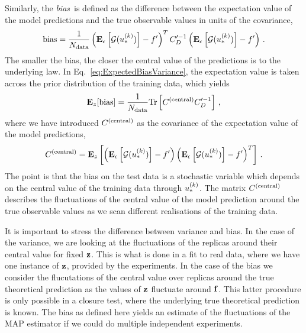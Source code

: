 Similarly, the {\em bias}\ is defined as the difference between the expectation
value of the model predictions and the true observable values in units of the
covariance, \ie 
\begin{equation}
    \label{eq:BiasDef}
    {\rm bias} = \frac{1}{N_{\rm data}}
    \left( \mathbf{E}_{\epsilon}\left[ \mathcal{G}(u_*^{(k)}) \right] - f^\prime \right)^T
        C_D^{\prime -1}
    \left( \mathbf{E}_{\epsilon}\left[ \mathcal{G}(u_*^{(k)}) \right] - f^\prime \right)\, .
\end{equation}
The smaller the bias, the closer the central value of the predictions is to the
underlying law. In Eq.~\ref{eq:ExpectedBiasVariance}, the expectation value is
taken across the prior distribution of the training data, which yields
\begin{equation}
    \mathbf{E}_{z}[{\rm bias}] = \frac{1}{N_{\rm data}}
    {\rm Tr} \left[ C^{(\rm central)} C_D^{\prime -1}{} \right]\, ,
\end{equation}
where we have introduced $C^{(\rm central)}$ as the covariance of the expectation value
of the model predictions,
\begin{equation}
    \label{eq:CovCentDef}
    C^{(\rm central)} = 
    \mathbf{E}_{z}\left[
        \left( \mathbf{E}_{\epsilon}\left[ \mathcal{G}(u_*^{(k)}) \right] - f^\prime \right)
        \left( \mathbf{E}_{\epsilon}\left[ \mathcal{G}(u_*^{(k)}) \right] - f^\prime \right)^T   
    \right]\, .
\end{equation}
The point is that the bias on the test data is a stochastic variable which
depends on the central value of the training data through $u_*^{(k)}$. The
matrix $C^{(\rm central)}$ describes the fluctuations of the central value of the model
prediction around the true observable values as we scan different realisations
of the training data. 

It is important to stress the difference between variance and bias. In the case
of the variance, we are looking at the fluctuations of the replicas around their
central value for fixed $\mathbf{z}$. This is what is done in a fit to real
data, where we have one instance of $\mathbf{z}$, provided by the experiments.
In the case of the bias we consider the flucutations of the central value over
replicas around the true theoretical prediction as the values of $\mathbf{z}$
fluctuate around $\mathbf{f}$. This latter procedure is only possible in a
closure test, where the underlying true theoretical prediction is known. The
bias as defined here yields an estimate of the fluctuations of the MAP estimator
if we could do multiple independent experiments. 


